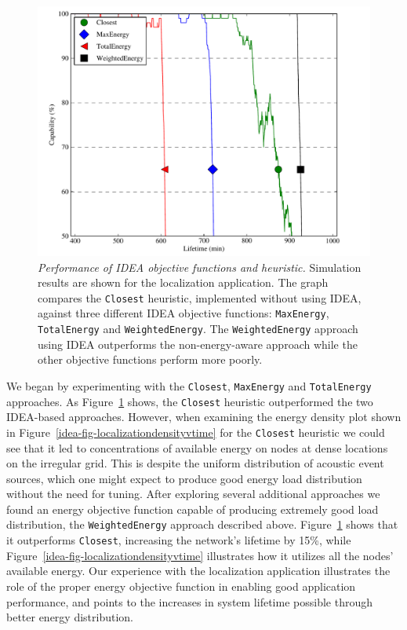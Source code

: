 \begin{figure}[t]
\begin{center}
\includegraphics[width=0.7\hsize]{./5-idea/figs/ideavheuristics.pdf}
\end{center}

\caption{\textit{Performance of IDEA objective functions and heuristic.}
Simulation results are shown for the localization application. The graph
compares the \texttt{Closest} heuristic, implemented without using IDEA,
against three different IDEA objective functions: \texttt{MaxEnergy},
\texttt{TotalEnergy} and \texttt{WeightedEnergy}. The \texttt{WeightedEnergy}
approach using IDEA outperforms the non-energy-aware approach while the other
objective functions perform more poorly.}

\label{idea-fig-ideavheuristics}
\end{figure}

We began by experimenting with the \texttt{Closest}, \texttt{MaxEnergy} and
\texttt{TotalEnergy} approaches. As Figure~\ref{idea-fig-ideavheuristics}
shows, the \texttt{Closest} heuristic outperformed the two IDEA-based
approaches.  However, when examining the energy density plot shown in
Figure~\ref{idea-fig-localizationdensityvtime} for the \texttt{Closest}
heuristic we could see that it led to concentrations of available energy on
nodes at dense locations on the irregular grid. This is despite the uniform
distribution of acoustic event sources, which one might expect to produce
good energy load distribution without the need for tuning. After exploring
several additional approaches we found an energy objective function capable
of producing extremely good load distribution, the \texttt{WeightedEnergy}
approach described above. Figure~\ref{idea-fig-ideavheuristics} shows that
it outperforms \texttt{Closest}, increasing the network's lifetime by 15\%,
while Figure~\ref{idea-fig-localizationdensityvtime} illustrates how it
utilizes all the nodes' available energy. Our experience with the
localization application illustrates the role of the proper energy objective
function in enabling good application performance, and points to the
increases in system lifetime possible through better energy distribution. 
